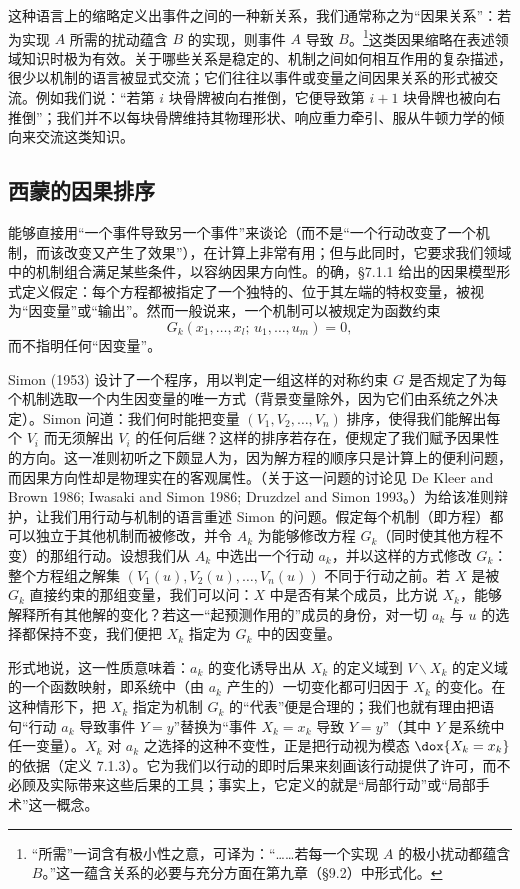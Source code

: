 这种语言上的缩略定义出事件之间的一种新关系，我们通常称之为“因果关系”：若为实现 $A$ 所需的扰动蕴含 $B$ 的实现，则事件 $A$ 导致 $B$。\footnote{“所需”一词含有极小性之意，可译为：“……若每一个实现 $A$ 的极小扰动都蕴含 $B$。”这一蕴含关系的必要与充分方面在第九章（\S 9.2）中形式化。}这类因果缩略在表述领域知识时极为有效。关于哪些关系是稳定的、机制之间如何相互作用的复杂描述，很少以机制的语言被显式交流；它们往往以事件或变量之间因果关系的形式被交流。例如我们说：“若第 $i$ 块骨牌被向右推倒，它便导致第 $i+1$ 块骨牌也被向右推倒”；我们并不以每块骨牌维持其物理形状、响应重力牵引、服从牛顿力学的倾向来交流这类知识。

\subsection{西蒙的因果排序}

能够直接用“一个事件导致另一个事件”来谈论（而不是“一个行动改变了一个机制，而该改变又产生了效果”），在计算上非常有用；但与此同时，它要求我们领域中的机制组合满足某些条件，以容纳因果方向性。的确，\S 7.1.1 给出的因果模型形式定义假定：每个方程都被指定了一个独特的、位于其左端的特权变量，被视为“因变量”或“输出”。然而一般说来，一个机制可以被规定为函数约束
\[
G_k(x_1,\dots,x_l;\,u_1,\dots,u_m)=0,
\]
而不指明任何“因变量”。

Simon (1953) 设计了一个程序，用以判定一组这样的对称约束 $G$ 是否规定了为每个机制选取一个内生因变量的唯一方式（背景变量除外，因为它们由系统之外决定）。Simon 问道：我们何时能把变量 $(V_1,V_2,\dots,V_n)$ 排序，使得我们能解出每个 $V_i$ 而无须解出 $V_i$ 的任何后继？这样的排序若存在，便规定了我们赋予因果性的方向。这一准则初听之下颇显人为，因为解方程的顺序只是计算上的便利问题，而因果方向性却是物理实在的客观属性。（关于这一问题的讨论见 De Kleer and Brown 1986; Iwasaki and Simon 1986; Druzdzel and Simon 1993。）为给该准则辩护，让我们用行动与机制的语言重述 Simon 的问题。假定每个机制（即方程）都可以独立于其他机制而被修改，并令 $A_k$ 为能够修改方程 $G_k$（同时使其他方程不变）的那组行动。设想我们从 $A_k$ 中选出一个行动 $a_k$，并以这样的方式修改 $G_k$：整个方程组之解集 $(V_1(u),V_2(u),\dots,V_n(u))$ 不同于行动之前。若 $X$ 是被 $G_k$ 直接约束的那组变量，我们可以问：$X$ 中是否有某个成员，比方说 $X_k$，能够解释所有其他解的变化？若这一“起预测作用的”成员的身份，对一切 $a_k$ 与 $u$ 的选择都保持不变，我们便把 $X_k$ 指定为 $G_k$ 中的因变量。

形式地说，这一性质意味着：$a_k$ 的变化诱导出从 $X_k$ 的定义域到 $V\backslash X_k$ 的定义域的一个函数映射，即系统中（由 $a_k$ 产生的）一切变化都可归因于 $X_k$ 的变化。在这种情形下，把 $X_k$ 指定为机制 $G_k$ 的“代表”便是合理的；我们也就有理由把语句“行动 $a_k$ 导致事件 $Y=y$”替换为“事件 $X_k=x_k$ 导致 $Y=y$”（其中 $Y$ 是系统中任一变量）。$X_k$ 对 $a_k$ 之选择的这种不变性，正是把行动视为模态 $\dox{X_k=x_k}$ 的依据（定义 7.1.3）。它为我们以行动的即时后果来刻画该行动提供了许可，而不必顾及实际带来这些后果的工具；事实上，它定义的就是“局部行动”或“局部手术”这一概念。

